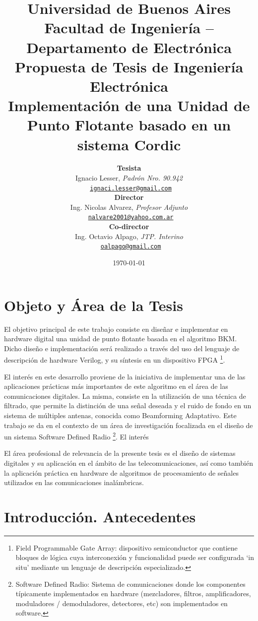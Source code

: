 \documentclass[a4paper]{article}
\title{
   {\normalsize
      Universidad de Buenos Aires\\
      Facultad de Ingeniería -- Departamento de Electrónica\\
      Propuesta de Tesis de Ingeniería Electrónica\\
      \vspace{0.7cm}
   }
   Implementación de una Unidad de Punto Flotante basado en un sistema Cordic
}
\author{ \textbf{Tesista}                                                           \\
         Ignacio Lesser, \textit{Padrón Nro. 90.942}                                \\
         \texttt{ \href{mailto:ignacio.lesser@gmail.com}{ignaci.lesser@gmail.com}}  \\[2.5ex]
         \textbf{Director}                                                          \\
         Ing. Nicolas Alvarez, \textit{Profesor Adjunto}                            \\
         \texttt{ \href{mailto:nalvare2001@yahoo.com.ar}{nalvare2001@yahoo.com.ar}} \\[2.5ex]
         \textbf{Co-director}                                                       \\
         Ing. Octavio Alpago, \textit{JTP. Interino}                                \\
         \texttt{ \href{mailto:oalpago@gmail.com}{oalpago@gmail.com}}               \\[2.5ex]
       }
\date{\today}
\begin{document}
\maketitle



\thispagestyle{fancy}

\section{Objeto y Área de la Tesis}

El objetivo principal de este trabajo consiste en diseñar e implementar en hardware digital una unidad de punto flotante basada en el algoritmo BKM. Dicho diseño e implementación será realizado a través del uso del lenguaje de descripción de hardware Verilog, y su síntesis en un dispositivo FPGA \footnote{\label{FPGA}Field Programmable Gate Array: dispositivo semiconductor que contiene bloques de lógica cuya interconexión y funcionalidad puede ser configurada `in situ' mediante un lenguaje de descripción especializado.}.

El interés en este desarrollo proviene de la iniciativa de implementar una de las aplicaciones prácticas más importantes de este algoritmo en el área de las comunicaciones digitales. La misma, consiste en la utilización de una técnica de filtrado, que permite la distinción de una señal deseada y el ruido de fondo en un sistema de múltiples antenas, conocida como Beamforming Adaptativo. Este trabajo se da en el contexto de un área de investigación focalizada en el diseño de un sistema Software Defined Radio \footnote{\label{SDR}Software Defined Radio: Sistema de comunicaciones donde los componentes típicamente implementados en hardware (mezcladores, filtros, amplificadores, moduladores / demoduladores, detectores, etc) son implementados en software,}.
El interés

El área profesional de relevancia de la presente tesis es el diseño de sistemas digitales y su aplicación en el ámbito de las telecomunicaciones, así como también la aplicación práctica en hardware de algoritmos de procesamiento de señales utilizados en las comunicaciones inalámbricas.

\newpage

\section{Introducción. Antecedentes}
\end{document}
